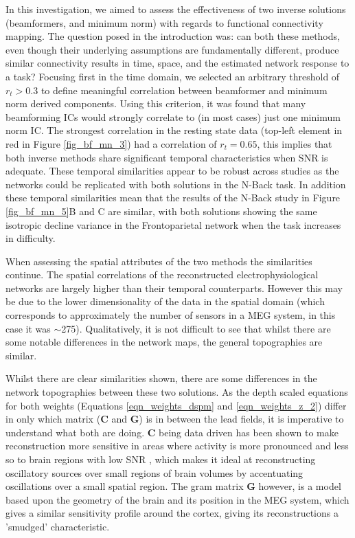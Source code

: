 In this investigation, we aimed to assess the effectiveness of two inverse solutions (beamformers, and minimum norm) with regards to functional connectivity mapping. The question posed in the introduction was: can both these methods, even though their underlying assumptions are fundamentally different, produce similar connectivity results in time, space, and the estimated network response to a task? Focusing first in the time domain, we selected an arbitrary threshold of $r_t > 0.3$ to define meaningful correlation between beamformer and minimum norm derived components. Using this criterion, it was found that many beamforming ICs would strongly correlate to (in most cases) just one minimum norm IC. The strongest correlation in the resting state data (top-left element in red in Figure \ref{fig_bf_mn_3}) had a correlation of  $r_t = 0.65$, this implies that both inverse methods share significant temporal characteristics when SNR is adequate. These temporal similarities appear to be robust across studies as the networks could be replicated with both solutions in the N-Back task. In addition these temporal similarities mean that the results of the N-Back study in Figure \ref{fig_bf_mn_5}B and C are similar, with both solutions showing the same isotropic decline variance in the Frontoparietal network when the task increases in difficulty. 

When assessing the spatial attributes of the two methods the similarities continue. The spatial correlations of the reconstructed electrophysiological networks are largely higher than their temporal counterparts. However this may be due to the lower dimensionality of the data in the spatial domain (which corresponds to approximately the number of sensors in a MEG system, in this case it was $\sim$275). Qualitatively, it is not difficult to see that whilst there are some notable differences in the network maps, the general topographies are similar.

Whilst there are clear similarities shown, there are some differences in the network topographies between these two solutions. As the depth scaled equations for both weights (Equations \ref{eqn_weights_dspm} and \ref{eqn_weights_z_2}) differ in only which matrix ($\mathbf{C}$ and $\mathbf{G}$) is in between the lead fields, it is imperative to understand what both are doing. $\mathbf{C}$ being data driven has been shown to make reconstruction more sensitive in areas where activity is more pronounced and less so to brain regions with low SNR \citep{VanVeen1997,Gross2001,Barnes2003}, which makes it ideal at reconstructing oscillatory sources over small regions of brain volumes by accentuating oscillations over a small spatial region. The gram matrix $\mathbf{G}$ however, is a model based upon the geometry of the brain and its position in the MEG system, which gives a similar sensitivity profile around the cortex, giving its reconstructions a 'smudged' characteristic.


